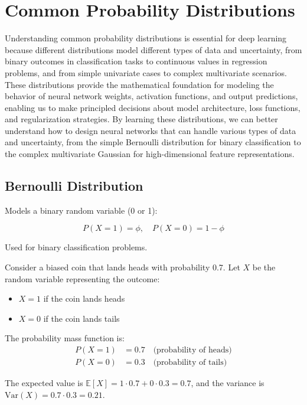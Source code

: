 
\section{Common Probability Distributions }
\label{sec:common-distributions}

Understanding common probability distributions is essential for deep learning because different distributions model different types of data and uncertainty, from binary outcomes in classification tasks to continuous values in regression problems, and from simple univariate cases to complex multivariate scenarios. These distributions provide the mathematical foundation for modeling the behavior of neural network weights, activation functions, and output predictions, enabling us to make principled decisions about model architecture, loss functions, and regularization strategies. By learning these distributions, we can better understand how to design neural networks that can handle various types of data and uncertainty, from the simple Bernoulli distribution for binary classification to the complex multivariate Gaussian for high-dimensional feature representations.

\subsection{Bernoulli Distribution}

Models a binary random variable (0 or 1):

\begin{equation}
P(X=1) = \phi, \quad P(X=0) = 1-\phi
\end{equation}

Used for binary classification problems.

\begin{example}
Consider a biased coin that lands heads with probability 0.7. Let $X$ be the random variable representing the outcome:
\begin{itemize}
    \item $X = 1$ if the coin lands heads
    \item $X = 0$ if the coin lands tails
\end{itemize}

The probability mass function is:
\begin{align}
P(X=1) &= 0.7 \quad \text{(probability of heads)} \\
P(X=0) &= 0.3 \quad \text{(probability of tails)}
\end{align}

The expected value is $\mathbb{E}[X] = 1 \cdot 0.7 + 0 \cdot 0.3 = 0.7$, and the variance is $\text{Var}(X) = 0.7 \cdot 0.3 = 0.21$.
\end{example}

